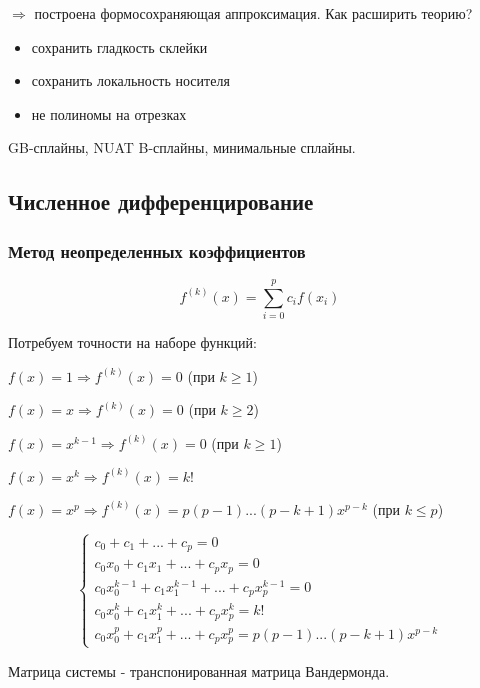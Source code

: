 $\Rightarrow$ построена формосохраняющая аппроксимация. Как расширить теорию? 
\begin{itemize}
    \item сохранить гладкость склейки
    \item сохранить локальность носителя
    \item не полиномы на отрезках
\end{itemize}

GB-сплайны, NUAT B-сплайны, минимальные сплайны.

\subsection{Численное дифференцирование}

\subsubsection{Метод неопределенных коэффициентов}

\begin{equation}
    f^{(k)}(x) = \sum_{i=0}^{p} c_i f(x_i)
\end{equation}

Потребуем точности на наборе функций:

$ f(x) = 1 \Rightarrow f^{(k)}(x) = 0 $ \quad (при $k \geq 1$)

$ f(x) = x \Rightarrow f^{(k)}(x) = 0 $ \quad (при $k \geq 2$)

$ f(x) = x^{k-1} \Rightarrow f^{(k)}(x) = 0 $ \quad (при $k \geq 1$)

$ f(x) = x^k \Rightarrow f^{(k)}(x) = k! $

$ f(x) = x^p \Rightarrow f^{(k)}(x) = p (p - 1) ... (p - k + 1) x^{p - k} $ \quad (при $k \leq p$)

\begin{equation}
    \begin{cases}
        c_0 + c_1 + ... + c_p = 0\\
        c_0 x_0 + c_1 x_1 + ... + c_p x_p = 0\\
        c_0 x_0^{k-1} + c_1 x_1^{k-1} + ... + c_p x_p^{k-1} = 0\\
        c_0 x_0^k + c_1 x_1^k + ... + c_p x_p^k = k!\\
        c_0 x_0^p + c_1 x_1^p + ... + c_p x_p^p = p (p - 1) ... (p - k + 1) x^{p - k}
    \end{cases}
\end{equation}

Матрица системы - транспонированная матрица Вандермонда.

